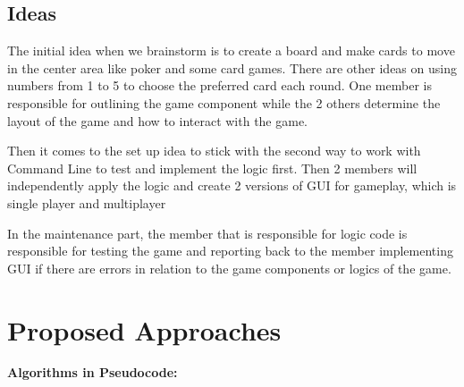 \documentclass[conference]{IEEEtran}
\begin{document}
    
\subsection{Ideas}
The initial idea when we brainstorm is to create a board and make cards to move in the center area like poker and some card games. There are other ideas on using numbers from 1 to 5 to choose the preferred card each round.  One member is responsible for outlining the game component while the 2 others determine the layout of the game and how to interact with the game.

Then it comes to the set up idea to stick with the second way to work with Command Line to test and implement the logic first. Then 2 members will independently apply the logic and create 2 versions of GUI for gameplay, which is single player and multiplayer

In the maintenance part, the member that is responsible for logic code is responsible for testing the game and reporting back to the member implementing GUI if there are errors in relation to the game components or logics of the game.  

\section{Proposed Approaches}

\textbf{Algorithms in Pseudocode:}
\end{document}
